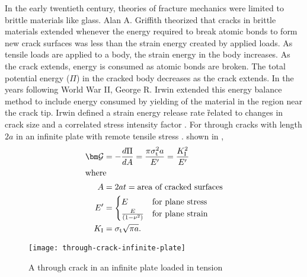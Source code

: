In the early twentieth century, theories of fracture mechanics were limited to brittle materials like glass.
Alan A. Griffith theorized that cracks in brittle materials extended whenever the energy required to break atomic bonds to form new crack surfaces was less than the strain energy created by applied loads.
As tensile loads are applied to a body, the strain energy in the body increases.
As the crack extends, energy is consumed as atomic bonds are broken.
The total potential energy (\(\Pi\)) in the cracked body decreases as the crack extends.
In the years following World War II, George R. Irwin extended this energy balance method to include energy consumed by yielding of the material in the region near the crack tip.
Irwin defined a strain energy release rate \G related to changes in crack size and a correlated stress intensity factor \K.
For through cracks with length \(2a\)  in an infinite plate with remote tensile stress \St{}. shown in ,
  \begin{align}
    \G &= - \frac{d \Pi}{dA} = \frac{\pi \St^2 a}{E'} = \frac{\KI^2}{E'} \label{eq:g} \\
    \intertext{where}
    A &= 2at = \textnormal{area of cracked surfaces} \\
    E' &=
    \begin{cases}
      E & \textnormal{for plane stress} \\
      \frac{E}{(1-\nu^2)} & \textnormal{for plane strain}
    \end{cases} \\
    \KI &= \St \sqrt{\pi a}.
  \end{align}
\begin{figure}[tbp]
\centering
\texttt{[image: through-crack-infinite-plate]}
\caption[A through crack in an infinite plate loaded in tension]{A through crack in an infinite plate loaded in tension \citep{anderson2005} \label{fig:through-crack-infinite-plate}}
\end{figure}

